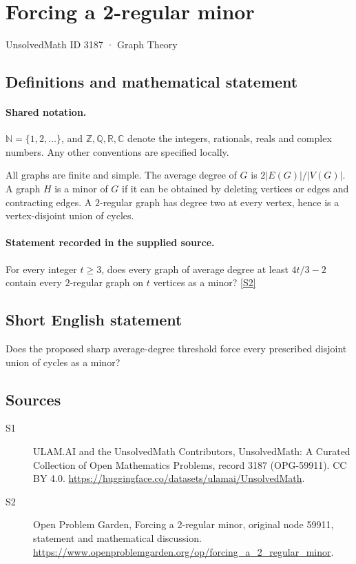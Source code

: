 \documentclass[11pt]{article}
\newcommand{\sref}[2]{\hyperlink{source:#1:#2}{[S#2]}}
\begin{document}
\setcounter{section}{3186}
\section{Forcing a 2-regular minor}\label{3187}
{\small\sffamily UnsolvedMath ID 3187 · Graph Theory}
\subsection{Definitions and mathematical statement}

\paragraph{Shared notation.}$\mathbb N=\{1,2,\ldots\}$, and $\mathbb Z,\mathbb Q,\mathbb R,\mathbb C$ denote the integers, rationals, reals and complex numbers. Any other conventions are specified locally.


All graphs are finite and simple. The average degree of $G$ is $2|E(G)|/|V(G)|$. A graph $H$ is a minor of $G$ if it can be obtained by deleting vertices or edges and contracting edges. A $2$-regular graph has degree two at every vertex, hence is a vertex-disjoint union of cycles.
\paragraph{Statement recorded in the supplied source.}
For every integer $t\ge3$, does every graph of average degree at least $4t/3-2$ contain every $2$-regular graph on $t$ vertices as a minor? \sref{3187}{2}
\subsection{Short English statement}
Does the proposed sharp average-degree threshold force every prescribed disjoint union of cycles as a minor?
\subsection{Sources}
\begin{description}
\item[\hypertarget{source:3187:1}{S1}] ULAM.AI and the UnsolvedMath Contributors, UnsolvedMath: A Curated Collection of Open Mathematics Problems, record 3187 (OPG-59911). CC BY 4.0. \url{https://huggingface.co/datasets/ulamai/UnsolvedMath}.
\item[\hypertarget{source:3187:2}{S2}] Open Problem Garden, Forcing a 2-regular minor, original node 59911, statement and mathematical discussion. \url{https://www.openproblemgarden.org/op/forcing_a_2_regular_minor}.
\end{description}
\label{end:3187}
\end{document}
